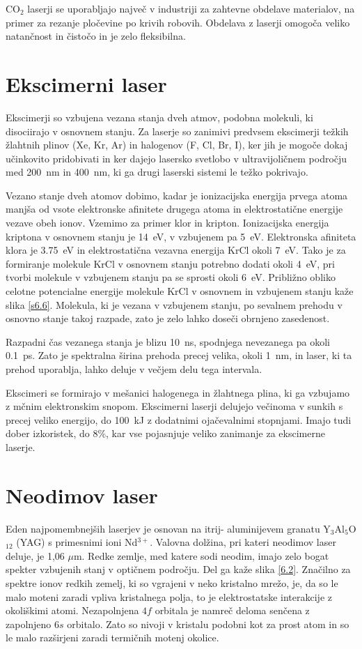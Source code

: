CO$_2$ laserji se uporabljajo največ v industriji za zahtevne obdelave
materialov, na primer za rezanje pločevine po krivih robovih. Obdelava z
laserji omogoča veliko natančnost in čistočo in je zelo fleksibilna.

\section{Ekscimerni laser}

Ekscimerji so vzbujena vezana stanja dveh atmov, podobna molekuli, ki
disociirajo v osnovnem stanju. Za laserje so zanimivi predvsem ekscimerji
težkih žlahtnih plinov (Xe, Kr, Ar) in halogenov (F, Cl, Br, I), ker jih
je mogoče dokaj učinkovito pridobivati in ker dajejo lasersko svetlobo v
ultravijoličnem področju med 200~nm in 400~nm, ki ga drugi laserski
sistemi le težko pokrivajo.

Vezano stanje dveh atomov dobimo, kadar je ionizacijska energija prvega
atoma manjša od vsote elektronske afinitete drugega atoma in
elektrostatične energije vezave obeh ionov. Vzemimo za primer klor in
kripton. Ionizacijska energija kriptona v osnovnem stanju je 14~eV, v
vzbujenem pa 5~eV. Elektronska afiniteta klora je 3.75~eV in
elektrostatična vezavna energija KrCl okoli 7~eV. Tako je za formiranje
molekule KrCl v osnovnem stanju potrebno dodati okoli 4~eV, pri tvorbi
molekule v vzbujenem stanju pa se sprosti okoli 6~eV. Približno obliko
celotne potencialne energije molekule KrCl v osnovnem in vzbujenem stanju
kaže slika \ref{s6.6}. Molekula, ki je vezana v vzbujenem stanju, po
sevalnem prehodu v osnovno stanje takoj razpade, zato je zelo lahko doseči
obrnjeno zasedenost.

Razpadni čas vezanega stanja je blizu 10~ns, spodnjega nevezanega pa okoli
0.1~ps. Zato je spektralna širina prehoda precej velika, okoli 1~nm, in
laser, ki ta prehod uporablja, lahko deluje v večjem delu tega intervala.

Ekscimeri se formirajo v mešanici halogenega in žlahtnega plina, ki ga
vzbujamo z mčnim elektronskim snopom. Ekscimerni laserji delujejo
večinoma v sunkih s precej veliko energijo, do 100~kJ z dodatnimi
ojačevalnimi stopnjami. Imajo tudi dober izkoristek, do 8\%, kar vse
pojasnjuje veliko zanimanje za ekscimerne laserje.


\section{Neodimov laser}

Eden najpomembnejših laserjev je osnovan na itrij- aluminijevem granatu Y$_3
$Al$_5$O$_{12}$ (YAG) s primesnimi ioni Nd$^{3+}$. Valovna dolžina, pri
kateri neodimov laser deluje, je 1,06 $\mu$m. Redke zemlje, med katere sodi
neodim, imajo zelo bogat spekter vzbujenih stanj v optičnem področju. Del
ga kaže slika \ref{6.2}. Značilno za spektre ionov redkih zemelj, ki so
vgrajeni v neko kristalno mrežo, je, da so le malo moteni zaradi vpliva
kristalnega polja, to je elektrostatske interakcije z okoliškimi atomi.
Nezapolnjena $4f$ orbitala je namreč deloma senčena z zapolnjeno $6s$
orbitalo. Zato so nivoji v kristalu podobni kot za prost atom in so le malo
razširjeni zaradi termičnih motenj okolice.

